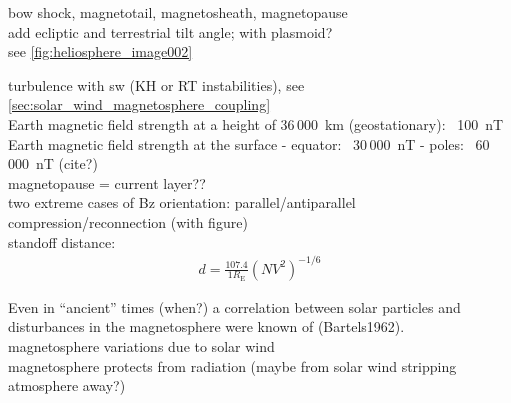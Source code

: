 bow shock, magnetotail, magnetosheath, magnetopause\\
add ecliptic and terrestrial tilt angle; with plasmoid?\\
see \autoref{fig:heliosphere_image002}\\
\begin{figure}[htb]
\end{figure}

turbulence with sw (KH or RT instabilities), see \autoref{sec:solar_wind_magnetosphere_coupling}\\

Earth magnetic field strength at a height of 36\,000~km (geostationary): ~100~nT\\
Earth magnetic field strength at the surface - equator: ~30\,000~nT - poles: ~60\,000~nT (cite?)\\

magnetopause = current layer??\\

two extreme cases of Bz orientation: parallel/antiparallel\\
compression/reconnection (with figure)\\

standoff distance:	\citep[p.~112]{Bothmer2007}
\begin{align}
	d = \frac{107.4}{1 R_\text{E}} (N V^2)^{-1/6}
\end{align}

Even in ``ancient'' times (when?) a correlation between solar particles and disturbances in the magnetosphere were known of (Bartels1962).\\

magnetosphere variations due to solar wind\\
magnetosphere protects from radiation (maybe from solar wind stripping atmosphere away?)\\

